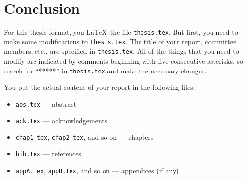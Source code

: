 \chapter{Conclusion}

For this thesis
format, you \LaTeX\ the file {\tt thesis.tex}. 
But first, you
need to make some modifications to {\tt thesis.tex}.
The title of your report, committee members, etc.,
are specified in {\tt thesis.tex}. All of the things that
you need to modify are indicated by comments beginning with five consecutive asterisks, 
so search for ``*****'' in {\tt thesis.tex} and make the necessary changes.

You put the actual content of your report 
in the following files:
\begin{itemize}
\item {\tt abs.tex} --- abstract
\item {\tt ack.tex} --- acknowledgements
\item {\tt chap1.tex}, {\tt chap2.tex}, and so on --- chapters
\item {\tt bib.tex} --- references
\item {\tt appA.tex}, {\tt appB.tex}, and so on --- appendices (if any)
\end{itemize}
